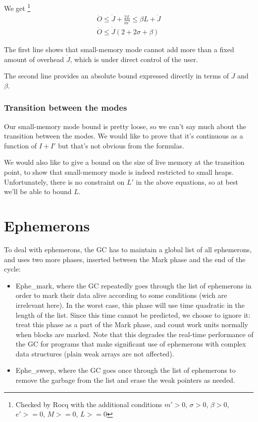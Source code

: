 \documentclass{article}
\begin{document}
We get
\footnote{
Checked by Rocq with the additional conditions
$m' > 0$,
$\sigma > 0$,
$\beta > 0$,
$e' >= 0$,
$M >= 0$,
$L >= 0$
}
\begin{gather*}
\dot{O} \leq \dot{J} + \frac{2L}{m'} \leq \beta L + \dot{J} \\
\dot{O} \leq \dot{J} (2 + 2\sigma + \beta)
\end{gather*}

The first line shows that small-memory mode cannot add more than a
fixed amount of overhead $\dot{J}$, which is under direct control of
the user.

The second line provides an absolute bound expressed directly in terms
of $\dot{J}$ and $\beta$.

\subsubsection{Transition between the modes}

Our small-memory mode bound is pretty loose, so we can't say much
about the transition between the modes. We would like to prove that
it's continuous as a function of $I+I'$ but that's not obvious from
the formulas.

We would also like to give a bound on the size of live memory at the
transition point, to show that small-memory mode is indeed restricted
to small heaps. Unfortunately, there is no constraint on $L'$ in the
above equations, so at best we'll be able to bound $L$.

\section{Ephemerons}

To deal with ephemerons, the GC has to maintain a global list of all
ephemerons, and uses two more phases, inserted between
the Mark phase and the end of the cycle:
\begin{itemize}
\item Ephe\_mark, where the GC repeatedly goes through the list of
ephemerons in order to mark their data alive according to some
conditions (wich are irrelevant here). In the worst case, this phase
will use time quadratic in the length of the list. Since this time
cannot be predicted, we choose to ignore it: treat this phase as a
part of the Mark phase, and count work units normally when blocks are
marked. Note that this degrades the real-time performance of the GC
for programs that make significant use of ephemerons with complex data
structures (plain weak arrays are not affected).
\item Ephe\_sweep, where the GC goes once through the list of
ephemerons to remove the garbage from the list and erase the weak
pointers as needed.
\end{itemize}
\end{document}
